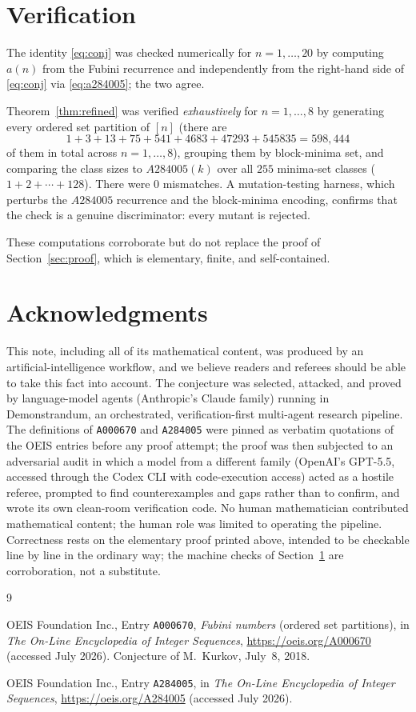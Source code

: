 \documentclass[11pt]{article}
\theoremstyle{definition}
\theoremstyle{remark}
\begin{document}
\section{Verification}\label{sec:verify}

The identity \eqref{eq:conj} was checked numerically for $n=1,\dots,20$ by
computing $a(n)$ from the Fubini recurrence and independently from the
right-hand side of \eqref{eq:conj} via \eqref{eq:a284005}; the two agree.

Theorem~\ref{thm:refined} was verified \emph{exhaustively} for $n=1,\dots,8$ by
generating every ordered set partition of $[n]$ (there are
\[
  1+3+13+75+541+4683+47293+545835=598{,}444
\]
of them in total across $n=1,\dots,8$), grouping them by block-minima set, and
comparing the class sizes to $A284005(k)$ over all $255$ minima-set classes
($1+2+\cdots+128$). There were $0$ mismatches. A mutation-testing harness, which
perturbs the $A284005$ recurrence and the block-minima encoding, confirms that
the check is a genuine discriminator: every mutant is rejected.

These computations corroborate but do not replace the proof of
Section~\ref{sec:proof}, which is elementary, finite, and self-contained.

\section*{Acknowledgments}

This note, including all of its mathematical content, was produced by an
artificial-intelligence workflow, and we believe readers and referees should be
able to take this fact into account. The conjecture was selected, attacked, and
proved by language-model agents (Anthropic's Claude family) running in
Demonstrandum, an orchestrated, verification-first multi-agent research
pipeline. The definitions of \texttt{A000670} and \texttt{A284005} were pinned
as verbatim quotations of the OEIS entries before any proof attempt; the proof
was then subjected to an adversarial audit in which a model from a different
family (OpenAI's GPT-5.5, accessed through the Codex CLI with code-execution
access) acted as a hostile referee, prompted to find counterexamples and gaps
rather than to confirm, and wrote its own clean-room verification code. No human
mathematician contributed mathematical content; the human role was limited to
operating the pipeline. Correctness rests on the elementary proof printed above,
intended to be checkable line by line in the ordinary way; the machine checks of
Section~\ref{sec:verify} are corroboration, not a substitute.

\begin{thebibliography}{9}

OEIS Foundation Inc.,
Entry \texttt{A000670}, \emph{Fubini numbers} (ordered set partitions), in
\emph{The On-Line Encyclopedia of Integer Sequences},
\url{https://oeis.org/A000670} (accessed July 2026). Conjecture of
M.~Kurkov, July~8, 2018.

OEIS Foundation Inc.,
Entry \texttt{A284005}, in \emph{The On-Line Encyclopedia of Integer
Sequences}, \url{https://oeis.org/A284005} (accessed July 2026).

\end{thebibliography}
\end{document}
